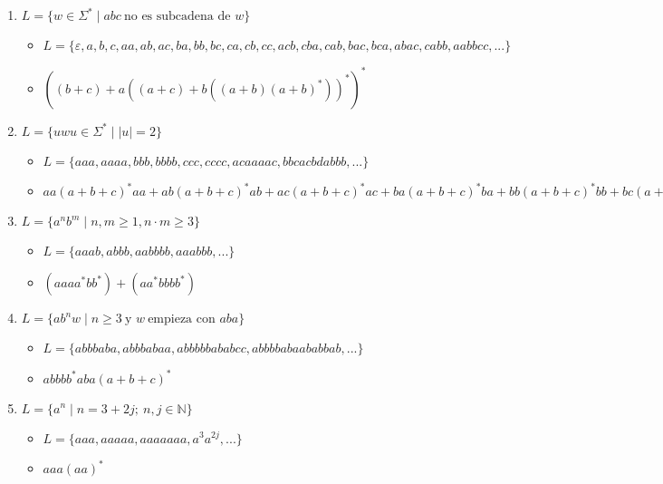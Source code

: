 \documentclass{article}
\begin{document}
\begin{enumerate}
\begin{enumerate}[label=\alph*)]
\begin{itemize}
            \item $L = \{\varepsilon, aaa, bbb, ccc, abc, bca, cba, acb, aaaaaa, bbbbbb, cccccc, abcabc, bcabca, cbacba, acbacb, aaabac, ...\}$
            \item $((a+b+c)(a + b + c)(a + b +c))^*$
        \end{itemize}
        \item $L = \{w \in \Sigma^* \mid abc~ \mbox{no es subcadena de } w\}$
        \begin{itemize}
            \item $L = \{\varepsilon, a, b, c, aa, ab, ac, ba, bb, bc, ca, cb, cc, acb, cba, cab, bac, bca, abac, cabb, aabbcc, ...\}$
            \item $((b + c)+ a((a +c) + b((a + b)(a + b)^*))^*)^*$
        \end{itemize}
        \item $L = \{uwu \in \Sigma^* \mid |u| = 2\}$
        \begin{itemize}
            \item $L = \{aaa, aaaa, bbb, bbbb, ccc, cccc, acaaaac, bbcacbdabbb, ...\}$
            \item $aa (a + b + c)^* aa + ab (a + b + c)^* ab + ac (a + b + c)^* ac + ba (a + b + c)^* ba + bb (a + b + c)^* bb + bc (a + b + c)^* bc + ca (a + b + c)^* ca + cb (a + b + c)^* cb + cc (a + b + c)^* cc$
        \end{itemize}
        \item $L = \{a^nb^m \mid n,m \ge 1, n \cdot m \ge 3 \}$
        \begin{itemize}
            \item $L = \{aaab,abbb, aabbbb, aaabbb, ... \}$
            \item $(aaaa^*bb^*) + (aa^*bbbb^*)$
        \end{itemize}
        \item $L = \{ab^nw \mid n \ge 3 ~\mbox{y } w ~\mbox{empieza con } aba\}$
        \begin{itemize}
            \item $L = \{abbbaba, abbbabaa, abbbbbababcc, abbbbabaababbab, ...\}$
            \item $abbbb^*aba(a + b + c)^*$
        \end{itemize}
        \item $L = \{a^n \mid n = 3 + 2j; ~n, j \in \mathbb{N} \}$
        \begin{itemize}
            \item $L=\{aaa, aaaaa, aaaaaaa, a^3a^{2j},...\}$
            \item $aaa(aa)^*$
        \end{itemize}
    \end{enumerate}
    

\end{enumerate}
\end{document}
